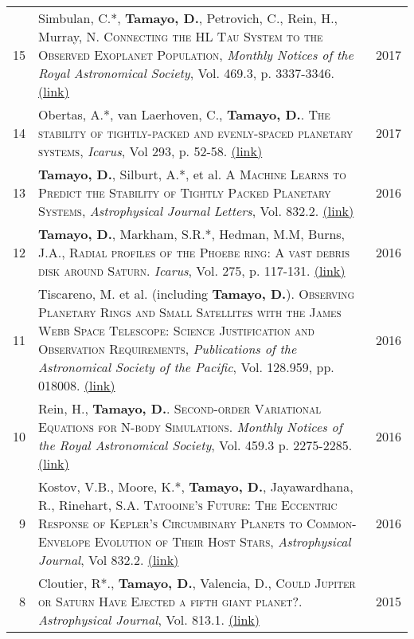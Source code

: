 \documentclass[10pt]{article} %
\begin{document}
{\begin{tabular}{>{\hfill}r|p{14.3cm}l}
15 & Simbulan, C.*, {\bf Tamayo, D.}, Petrovich, C., Rein, H., Murray, N. \textsc{Connecting the HL Tau System to the Observed Exoplanet Population}, {\it Monthly Notices of the Royal Astronomical Society}, Vol. 469.3, p. 3337-3346. \href{https://arxiv.org/abs/1703.09132}{(link)} & 2017 \\

14 & Obertas, A.*, van Laerhoven, C., {\bf Tamayo, D.}. \textsc{The stability of tightly-packed and evenly-spaced planetary systems}, {\it Icarus}, Vol 293, p. 52-58. \href{https://arxiv.org/abs/1703.08426}{(link)} & 2017 \\

13 & {\bf Tamayo, D.}, Silburt, A.*, et al. \textsc{A Machine Learns to Predict the Stability of Tightly Packed Planetary Systems}, {\it Astrophysical Journal Letters}, Vol. 832.2. \href{https://arxiv.org/abs/1610.05359}{(link)}& 2016 \\

12 & {\bf Tamayo, D.}, Markham, S.R.*, Hedman, M.M, Burns, J.A., \textsc{Radial profiles of the Phoebe ring: A vast debris disk around Saturn}.  {\it Icarus}, Vol. 275, p. 117-131. \href{http://arxiv.org/abs/1604.03119}{(link)} & 2016 \\

11 & Tiscareno, M. et al. (including {\bf Tamayo, D.}). \textsc{Observing Planetary Rings and Small Satellites with the James Webb Space Telescope: Science Justification and Observation Requirements}, {\it Publications of the Astronomical Society of the Pacific}, Vol. 128.959, pp. 018008. \href{https://arxiv.org/abs/1403.6849v3}{(link)} & 2016 \\

10 & Rein, H., {\bf Tamayo, D.}. \textsc{Second-order Variational Equations for N-body Simulations.} {\it Monthly Notices of the Royal Astronomical Society}, Vol. 459.3 p. 2275-2285. \href{http://arxiv.org/abs/1603.03424}{(link)} & 2016 \\

9 & Kostov, V.B., Moore, K.*, {\bf Tamayo, D.}, Jayawardhana, R., Rinehart, S.A. \textsc{Tatooine's Future: The Eccentric Response of Kepler's Circumbinary Planets to Common-Envelope Evolution of Their Host Stars}, {\it Astrophysical Journal}, Vol 832.2. \href{https://arxiv.org/abs/1610.03436}{(link)} & 2016 \\

8 & Cloutier, R*., {\bf Tamayo, D.}, Valencia, D., \textsc{Could Jupiter or Saturn Have Ejected a fifth giant planet?}.  {\it Astrophysical Journal}, Vol. 813.1. \href{http://arxiv.org/abs/1509.05397}{(link)} & 2015 \\


\end{tabular}}
\end{document}
